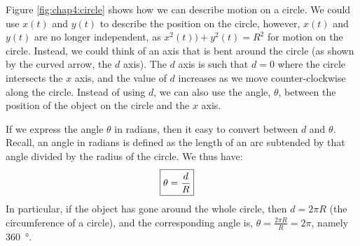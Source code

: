 Figure \ref{fig:chap4:circle} shows how we can describe motion on a circle. We could use $x(t)$ and $y(t)$ to describe the position on the circle, however, $x(t)$ and $y(t)$ are no longer independent, as $x^2(t))+y^2(t)=R^2$ for motion on the circle. Instead, we could think of an axis that is bent around the circle (as shown by the curved arrow, the $d$ axis). The $d$ axis is such that $d=0$ where the circle intersects the $x$ axis, and the value of $d$ increases as we move counter-clockwise along the circle. Instead of using $d$, we can also use the angle, $\theta$, between the position of the object on the circle and the $x$ axis. 

If we express the angle $\theta$ in radians, then it easy to convert between $d$ and $\theta$. Recall, an angle in radians is defined as the length of an arc subtended by that angle divided by the radius of the circle. We thus have:
\begin{align}
\label{eqn:chap4:raddef}
\Aboxed{\theta=\frac{d}{R}}
\end{align}
In particular, if the object has gone around the whole circle, then $d=2\pi R$ (the circumference of a circle), and the corresponding angle is, $\theta=\frac{2\pi R}{R}=2\pi$, namely \SI{360}{\degree}. 

